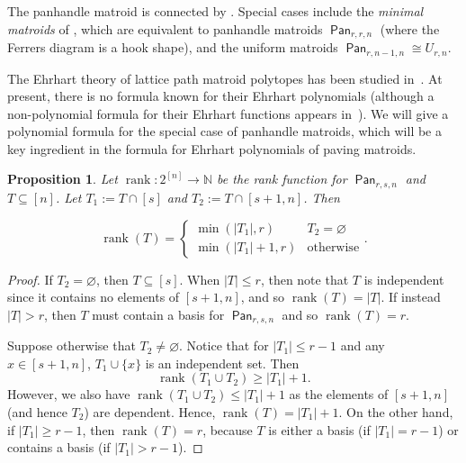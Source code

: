 \documentclass[11pt]{amsart}
\newtheorem{proposition}[theorem]{Proposition}
\theoremstyle{definition}
\renewcommand{\emptyset}{\varnothing}
\newcommand{\0}{\emptyset}
\newcommand{\N}{\mathbb{N}}
\DeclareMathOperator{\Pan}{\mathsf{Pan}} %
\DeclareMathOperator{\rank}{\operatorname{rank}}
\begin{document}
The panhandle matroid is connected by \cite[Theorem~3.6]{LPM}.
Special cases include the \textit{minimal matroids} of \cite{Ferroni2021A}, which are equivalent to panhandle matroids $\Pan_{r,r,n}$ (where the Ferrers diagram is a hook shape), and the uniform matroids $\Pan_{r,n-1,n}\cong U_{r,n}$.

The Ehrhart theory of lattice path matroid polytopes has been studied in~\cite{Bidkhori,KMR}.  At present, there is no formula known for their Ehrhart polynomials (although a non-polynomial formula for their Ehrhart functions appears in~\cite{Bidkhori}).  We will give a polynomial formula for the special case of panhandle matroids, which will be a key ingredient in the formula for Ehrhart polynomials of paving matroids.

\begin{proposition}\label{prop:rank_panhandle}
Let $\rank: 2^{[n]}\to \N$ be the rank function for $\Pan_{r,s,n}$ and $T\subseteq [n]$. Let $T_1:=T\cap  [s]$ and $T_2:=T\cap [s+1,n]$.
Then

\[\rank(T)=\begin{cases}
\min(|T_1|,r) & T_2=\emptyset\\
\min(|T_1|+1,r) & \text{otherwise}
\end{cases}.\]
\end{proposition}
\begin{proof}


If $T_2=\emptyset$, then $T\subseteq [s]$.
When $|T|\leq r$, then note that $T$ is independent since it contains no elements of $[s+1,n]$, and so $\rank(T)=|T|$.
If instead $|T|> r$, then $T$ must contain a basis for $\Pan_{r,s,n}$ and so $\rank(T)=r$.

Suppose otherwise that $T_2\neq \emptyset$.
Notice that for $|T_1|\leq r-1$ and any $x\in [s+1,n]$, $T_1\cup \{x\}$ is an independent set.
Then \[\rank(T_1\cup T_2)\geq |T_1|+1.\]
However, we also have $\rank(T_1\cup T_2)\leq |T_1|+1$ as the elements of $[s+1,n]$ (and hence $T_2$) are dependent.
Hence, $\rank (T)=|T_1|+1$.
On the other hand, if $|T_1|\geq r-1$, then $\rank(T)=r$, because $T$ is either a basis (if $|T_1|=r-1$) or contains a basis (if $|T_1|>r-1$).

\end{proof}
\end{document}
